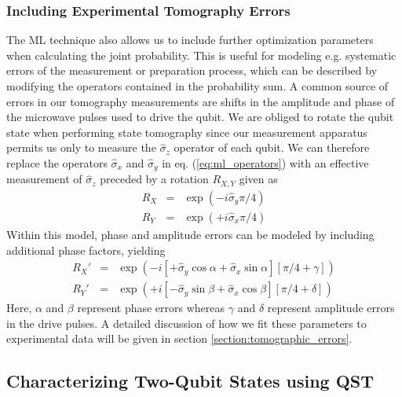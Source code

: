 \subsubsection{Including Experimental Tomography Errors}

The ML technique also allows us to include further optimization parameters when calculating the joint probability. This is useful for modeling e.g. systematic errors of the measurement or preparation process, which can be described by modifying the operators contained in the probability sum. A common source of errors in our tomography measurements are shifts in the amplitude and phase of the microwave pulses used to drive the qubit. We are obliged to rotate the qubit state when performing state tomography since our measurement apparatus permits us only to measure the $\hat{\sigma}_z$ operator of each qubit. We can therefore replace the operators $\hat{\sigma}_x$ and $\hat{\sigma}_y$ in eq. (\ref{eq:ml_operators}) with an effective measurement of $\hat{\sigma}_z$ preceded by a rotation $R_{X,Y}$ given as
\begin{eqnarray}
R_{X} & = & \exp{\left( -i \hat{\sigma}_y \pi / 4\right)} \\
R_{Y} & = & \exp{\left( +i \hat{\sigma}_x \pi / 4\right)} 
\end{eqnarray}
Within this model, phase and amplitude errors can be modeled by including additional phase factors, yielding
\begin{eqnarray}
R_{X}' & = & \exp{\left( -i \left[+\hat{\sigma}_y\cos{\alpha}+\hat{\sigma}_x\sin{\alpha} \right] \left[\pi / 4+\gamma\right]\right)} \\
R_{Y}' & = & \exp{\left( +i \left[-\hat{\sigma}_y\sin{\beta}+\hat{\sigma}_x\cos{\beta}\right] \left[\pi / 4+\delta\right]\right)} 
\end{eqnarray}
Here, $\alpha$ and $\beta$ represent phase errors whereas $\gamma$ and $\delta$ represent amplitude errors in the drive pulses. A detailed discussion of how we fit these parameters to experimental data will be given in section \ref{section:tomographic_errors}.

\subsection{Characterizing Two-Qubit States using QST}

